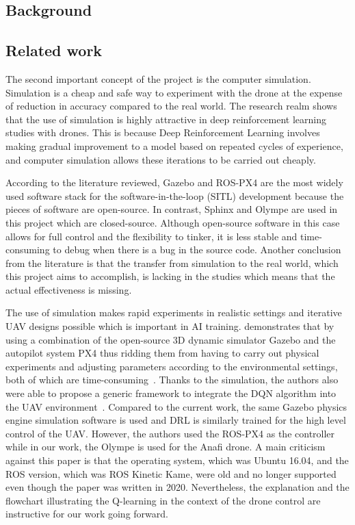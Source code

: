 \documentclass[../main.tex]{subfiles}
\begin{document}
\subsection{Background}

\blindtext

\subsection{Related work}



The second important concept of the project is the computer simulation.
Simulation is a cheap and safe way to experiment with the drone
at the expense of reduction in accuracy compared to the real world.
The research realm shows that the use of simulation is highly attractive
in deep reinforcement learning studies with drones.
This is because Deep Reinforcement Learning involves
making gradual improvement to a model based on 
repeated cycles of experience, and computer simulation 
allows these iterations to be carried out cheaply.

According to the literature reviewed, 
Gazebo and ROS-PX4 are the most widely used software stack 
for the software-in-the-loop (\textsc{SITL}) development
because the pieces of software are open-source. 
In contrast, Sphinx and Olympe are used in this project 
which are closed-source.
Although open-source software in this case 
allows for full control and the flexibility to tinker,
it is less stable and time-consuming to debug
when there is a bug in the source code.
Another conclusion from the literature is that 
the transfer from simulation to the real world,
which this project aims to accomplish,
is lacking in the studies 
which means that the actual effectiveness is missing.

The use of simulation makes rapid experiments in realistic settings 
and iterative UAV designs possible which is important in AI training. 
\citeauthor{Zho20} demonstrates that by %
using a combination of the open-source 3D dynamic simulator Gazebo
and the autopilot system PX4
thus ridding them from having to carry out physical experiments
and adjusting parameters according to the environmental settings,
both of which are time-consuming~\cite{Zho20}.
Thanks to the simulation, 
the authors also were able to propose a generic
framework to integrate the DQN algorithm into 
the UAV environment~\cite{Zho20}.
Compared to the current work, the same Gazebo physics engine
simulation software is used and DRL is similarly trained
for the high level control of the UAV. 
However, the authors used the ROS-PX4 as the controller 
while in our work, the Olympe is used for the Anafi drone.
A main criticism against this paper is that the operating system,
which was Ubuntu 16.04, and 
the ROS version, which was ROS Kinetic Kame, 
were old and no longer supported 
even though the paper was written in 2020.
Nevertheless, the explanation and the flowchart illustrating the 
Q-learning in the context of the drone control are instructive 
for our work going forward.
\end{document}

